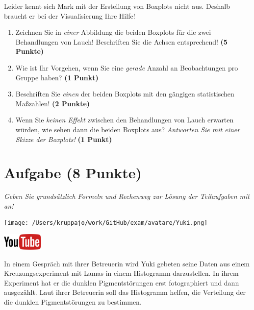 \documentclass[a4paper, 9pt]{scrartcl}\usepackage[]{graphicx}\usepackage[]{xcolor}
\begin{document}
Leider kennt sich Mark mit der Erstellung von Boxplots nicht aus. Deshalb braucht er bei der Visualisierung Ihre Hilfe!

\begin{enumerate}
\item Zeichnen Sie in \textit{einer} Abbildung die beiden Boxplots für die zwei Behandlungen von Lauch! Beschriften Sie die Achsen entsprechend! \textbf{(5 Punkte)} 
\item Wie ist Ihr Vorgehen, wenn Sie eine \textit{gerade} Anzahl an
  Beobachtungen pro Gruppe haben? \textbf{(1 Punkt)}
\item Beschriften Sie \textit{einen} der beiden Boxplots mit den gängigen
  statistischen Maßzahlen! \textbf{(2 Punkte)}
\item Wenn Sie \textit{keinen Effekt} zwischen den Behandlungen von
  Lauch erwarten würden, wie sehen dann die beiden Boxplots aus?
  \textit{Antworten Sie mit einer Skizze der Boxplots!}
  \textbf{(1 Punkt)}
\end{enumerate} 
\clearpage

\section{Aufgabe \hfill (8 Punkte)}

\textit{Geben Sie grundsätzlich Formeln und Rechenweg zur Lösung der Teilaufgaben mit an!} \\[1Ex]
 

 
\begin{minipage}[t]{0.5\textwidth}
\texttt{[image: /Users/kruppajo/work/GitHub/exam/avatare/Yuki.png]}
\end{minipage}
\begin{minipage}[t]{0.5\textwidth}
\hfill
\href{https://youtu.be/aXvxGC4YLqk}{\includegraphics[width = 2cm]{img/youtube}}\\[1Ex]
\end{minipage}
\vspace{1ex}



In einem Gespräch mit ihrer Betreuerin wird Yuki gebeten seine Daten aus einem Kreuzungsexperiment mit Lamas in einem Histogramm darzustellen. In ihrem Experiment hat er die dunklen Pigmentstörungen erst fotographiert und dann ausgezählt. Laut ihrer Betreuerin soll das Histogramm helfen, die Verteilung der die dunklen Pigmentstörungen zu bestimmen.
\end{document}
